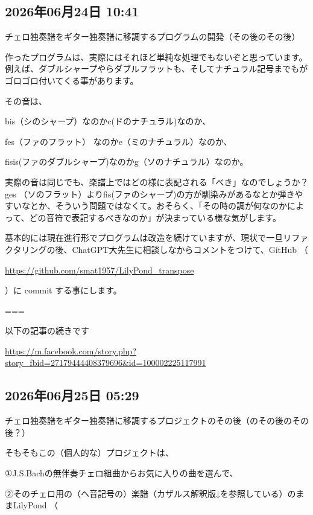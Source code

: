 \documentclass[facebook_diary.tex]{subfiles}
\begin{document}
\subsection*{2026年06月24日 10:41}

チェロ独奏譜をギター独奏譜に移調するプログラムの開発（その後のその後）


作ったプログラムは、実際にはそれほど単純な処理でもないぞと思っています。例えば、ダブルシャープやらダブルフラットも、そしてナチュラル記号までもがゴロゴロ付いてくる事があります。

その音は、

bis（シのシャープ）なのかc(ドのナチュラル)なのか、

fes（ファのフラット） なのかe（ミのナチュラル）なのか、

fisis(ファのダブルシャープ)なのかg（ソのナチュラル）なのか。

実際の音は同じでも、楽譜上ではどの様に表記される「べき」なのでしょうか？ges （ソのフラット）よりfis(ファのシャープ)の方が馴染みがあるなとか弾きやすいなとか、そういう問題ではなくて。おそらく、「その時の調が何なのかによって、どの音符で表記するべきなのか」が決まっている様な気がします。


基本的には現在進行形でプログラムは改造を続けていますが、現状で一旦リファクタリングの後、ChatGPT大先生に相談しなからコメントをつけて、GitHub （ 

\url{https://github.com/smat1957/LilyPond_transpose}

 ）に commit する事にします。


===

以下の記事の続きです

\url{https://m.facebook.com/story.php?story_fbid=27179444408379696&id=100002225117991}



\subsection*{2026年06月25日 05:29}

チェロ独奏譜をギター独奏譜に移調するプロジェクトのその後（のその後のその後？）


そもそもこの（個人的な）プロジェクトは、


①J.S.Bachの無伴奏チェロ組曲からお気に入りの曲を選んで、

②そのチェロ用の（ヘ音記号の）楽譜（カザルス解釈版↓を参照している）のままLilyPond （ 
\end{document}
